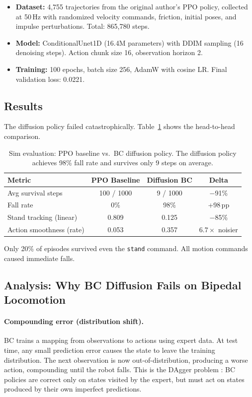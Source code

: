 \documentclass{article}
\begin{document}
\begin{itemize}[nosep]
  \item \textbf{Dataset:} 4,755 trajectories from the original author's PPO policy, collected at 50\,Hz with randomized velocity commands, friction, initial poses, and impulse perturbations. Total: 865,780 steps.
  \item \textbf{Model:} ConditionalUnet1D (16.4M parameters) with DDIM sampling (16 denoising steps). Action chunk size 16, observation horizon 2.
  \item \textbf{Training:} 100 epochs, batch size 256, AdamW with cosine LR. Final validation loss: 0.0221.
\end{itemize}


\subsection{Results}

The diffusion policy failed catastrophically. Table~\ref{tab:diffusion_results} shows the head-to-head comparison.

\begin{table}[t]
\caption{Sim evaluation: PPO baseline vs.\ BC diffusion policy. The diffusion policy achieves 98\% fall rate and survives only 9 steps on average.}
\label{tab:diffusion_results}
\centering
\begin{tabular}{lccc}
\toprule
Metric & PPO Baseline & Diffusion BC & Delta \\
\midrule
Avg survival steps & 100 / 1000 & 9 / 1000 & $-$91\% \\
Fall rate & 0\% & 98\% & +98\,pp \\
Stand tracking (linear) & 0.809 & 0.125 & $-$85\% \\
Action smoothness (rate) & 0.053 & 0.357 & $6.7\times$ noisier \\
\bottomrule
\end{tabular}
\end{table}

Only 20\% of episodes survived even the \texttt{stand} command. All motion commands caused immediate falls.


\subsection{Analysis: Why BC Diffusion Fails on Bipedal Locomotion}
\label{sec:bc_analysis}

\paragraph{Compounding error (distribution shift).}
BC trains a mapping from observations to actions using expert data. At test time, any small prediction error causes the state to leave the training distribution. The next observation is now out-of-distribution, producing a worse action, compounding until the robot falls. This is the DAgger problem \citep{ross2011dagger}: BC policies are correct only on states visited by the expert, but must act on states produced by their own imperfect predictions.
\end{document}

